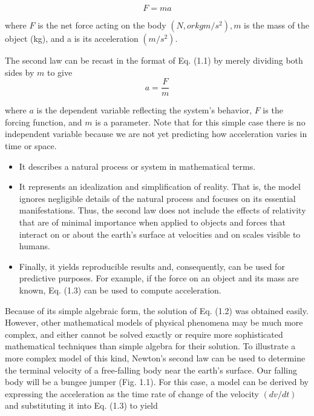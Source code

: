 \documentclass[../main.tex]{subfiles}
\begin{document}
\begin{equation}
\tag{1.2}
F=ma
\end{equation}

where $F$ is the net force acting on the body $(N, or kg m/s^2
), m$ is the mass of the object (kg),
and a is its acceleration $(m/s^2
)$.

The second law can be recast in the format of Eq. (1.1) by merely dividing both sides
by $m$ to give
\begin{equation}
\tag{1.3}
a=\dfrac{F}{m}
\end{equation}

where $a$ is the dependent variable reflecting the system's behavior, $F$ is the forcing function, and $m$ is a parameter. Note that for this simple case there is no independent variable
because we are not yet predicting how acceleration varies in time or space.

\begin{itemize}
\item  It describes a natural process or system in mathematical terms.
\item It represents an idealization and simplification of reality. That is, the model ignores negligible details of the natural process and focuses on its essential manifestations. Thus,
the second law does not include the effects of relativity that are of minimal importance
when applied to objects and forces that interact on or about the earth’s surface at velocities and on scales visible to humans.
\item  Finally, it yields reproducible results and, consequently, can be used for predictive purposes. For example, if the force on an object and its mass are known, Eq. (1.3) can be
used to compute acceleration.

\end{itemize}


Because of its simple algebraic form, the solution of Eq. (1.2) was obtained easily.
However, other mathematical models of physical phenomena may be much more complex,
and either cannot be solved exactly or require more sophisticated mathematical techniques
than simple algebra for their solution. To illustrate a more complex model of this kind,
Newton’s second law can be used to determine the terminal velocity of a free-falling body
near the earth’s surface. Our falling body will be a bungee jumper (Fig. 1.1). For this case,
a model can be derived by expressing the acceleration as the time rate of change of the
velocity $(dv/dt)$ and substituting it into Eq. (1.3) to yield
\end{document}
